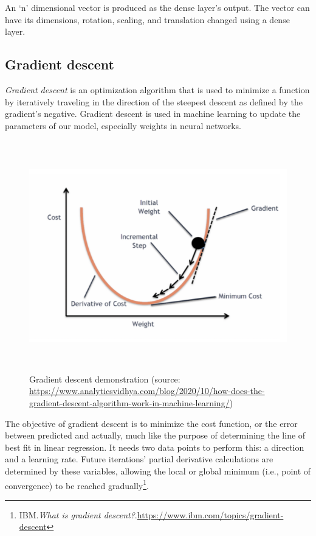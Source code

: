 An `n' dimensional vector is produced as the dense layer's output. The vector can have its dimensions, rotation, scaling, and translation changed using a dense layer. 

\newpage
\subsection{Gradient descent}
\label{subsec:gradient_descent}
\hspace{0.5cm}\emph{Gradient descent} is an optimization algorithm that is used to minimize a function by iteratively traveling in the direction of the steepest descent as defined by the gradient's negative. Gradient descent is used in machine learning to update the parameters of our model, especially weights in neural networks.
\begin{figure}[!h]
	\centering
	\includegraphics[width=\linewidth, height=10cm,keepaspectratio]{figures/gradient descent.png}
   \caption{Gradient descent demonstration (source: \url{https://www.analyticsvidhya.com/blog/2020/10/how-does-the-gradient-descent-algorithm-work-in-machine-learning/})}
\end{figure}

The objective of gradient descent is to minimize the cost function, or the error between predicted and actually, much like the purpose of determining the line of best fit in linear regression. It needs two data points to perform this: a direction and a learning rate. Future iterations' partial derivative calculations are determined by these variables, allowing the local or global minimum (i.e., point of convergence) to be reached gradually\footnote{IBM.\textit{What is gradient descent?}.\url{https://www.ibm.com/topics/gradient-descent}}.
